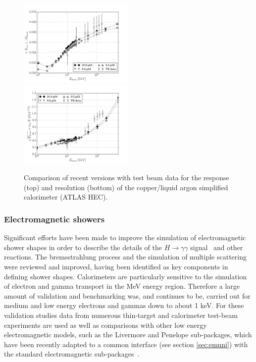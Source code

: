 \begin{figure}[htb]
 \begin{center}
    \includegraphics[width=0.5\textwidth]{figures/response.pdf}
    \includegraphics[width=0.5\textwidth]{figures/resolution.pdf}
   \caption{Comparison of recent \Gfour{} versions with test beam data for the
            response (top) and resolution (bottom) of the copper/liquid argon
            simplified calorimeter (ATLAS HEC).}
   \label{fig:response}
 \end{center}
\end{figure}

\subsubsection{Electromagnetic showers}
Significant efforts have been made to improve the simulation of electromagnetic
shower shapes in order to describe the details of the 
$H \rightarrow \gamma\gamma$ signal~\cite{Aad20121,Chatrchyan201230} and other 
reactions.  The bremsstrahlung process and the simulation of multiple scattering
were reviewed and improved, having been identified as key components in defining
shower shapes.  Calorimeters are particularly sensitive to the simulation of 
electron and gamma transport in the MeV energy region.  Therefore a large amount
of validation and benchmarking was, and continues to be, carried out for medium
and low energy electrons and gammas down to about 1 keV.  For these validation 
studies data from numerous thin-target and calorimeter test-beam experiments are 
used as well as comparisons with other \Gfour{} low energy electromagnetic 
models, such as the Livermore and Penelope sub-packages, which have been 
recently adapted to a common interface (see section \ref{sec:emuni}) with the 
standard electromagnetic sub-packages~\cite{pnst-VI}.

